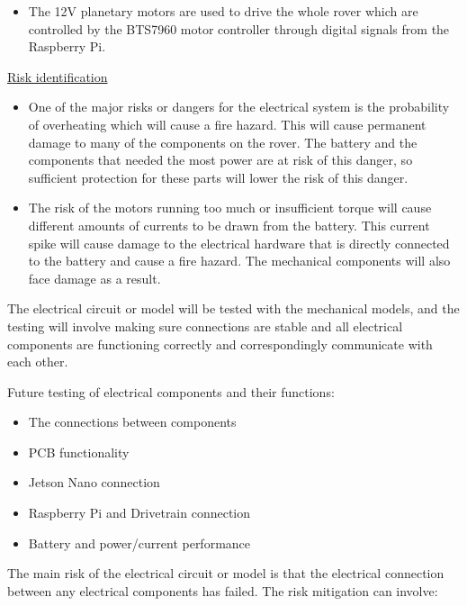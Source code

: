 \documentclass[a4paper, 10pt]{article}
\begin{document}
\begin{itemize}
		\item The 12V planetary motors are used to drive the whole rover which are controlled by the BTS7960 motor controller through digital signals from the Raspberry Pi.
		\end{itemize}


		\underline{Risk identification}

		\begin{itemize}
		\item
		One of the major risks or dangers for the electrical system is the probability of overheating which will cause a fire hazard. This will cause permanent damage to many of the components on the rover. The battery and the components that needed the most power are at risk of this danger, so sufficient protection for these parts will lower the risk of this danger.

		\item
		The risk of the motors running too much or insufficient torque will cause different amounts of currents to be drawn from the battery. This current spike will cause damage to the electrical hardware that is directly connected to the battery and cause a fire hazard. The mechanical components will also face damage as a result.
		\end{itemize}

		The electrical circuit or model will be tested with the mechanical models, and the testing will involve making sure connections are stable and all electrical components are functioning correctly and correspondingly communicate with each other.
		
		Future testing of electrical components and their functions:
		\begin{itemize}
		\item The connections between components

		\item PCB functionality

		\item Jetson Nano connection

		\item Raspberry Pi and Drivetrain connection

		\item Battery and power/current performance
		\end{itemize}

		The main risk of the electrical circuit or model is that the electrical connection between any electrical components has failed. The risk mitigation can involve:
\end{document}
